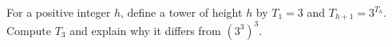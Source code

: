 For a positive integer $h$, define a tower of height $h$ by $T_1=3$ and $T_{h+1}=3^{T_h}$. Compute $T_3$ and explain why it differs from $(3^3)^3$.
